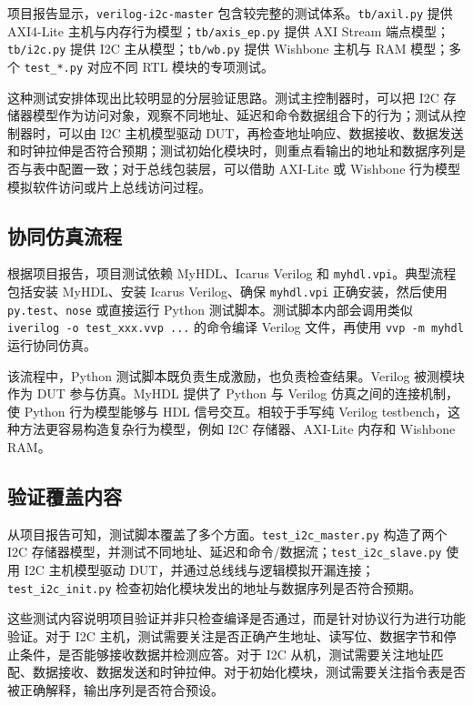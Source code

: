 \documentclass[12pt,a4paper]{article}
\numberwithin{equation}{section}
\begin{document}
项目报告显示，\texttt{verilog-i2c-master} 包含较完整的测试体系。\texttt{tb/axil.py} 提供 AXI4-Lite 主机与内存行为模型；\texttt{tb/axis\_ep.py} 提供 AXI Stream 端点模型；\texttt{tb/i2c.py} 提供 I2C 主从模型；\texttt{tb/wb.py} 提供 Wishbone 主机与 RAM 模型；多个 \texttt{test\_*.py} 对应不同 RTL 模块的专项测试。

这种测试安排体现出比较明显的分层验证思路。测试主控制器时，可以把 I2C 存储器模型作为访问对象，观察不同地址、延迟和命令数据组合下的行为；测试从控制器时，可以由 I2C 主机模型驱动 DUT，再检查地址响应、数据接收、数据发送和时钟拉伸是否符合预期；测试初始化模块时，则重点看输出的地址和数据序列是否与表中配置一致；对于总线包装层，可以借助 AXI-Lite 或 Wishbone 行为模型模拟软件访问或片上总线访问过程。

\subsection{协同仿真流程}

根据项目报告，项目测试依赖 MyHDL、Icarus Verilog 和 \texttt{myhdl.vpi}。典型流程包括安装 MyHDL、安装 Icarus Verilog、确保 \texttt{myhdl.vpi} 正确安装，然后使用 \texttt{py.test}、\texttt{nose} 或直接运行 Python 测试脚本。测试脚本内部会调用类似 \texttt{iverilog -o test\_xxx.vvp ...} 的命令编译 Verilog 文件，再使用 \texttt{vvp -m myhdl} 运行协同仿真。

该流程中，Python 测试脚本既负责生成激励，也负责检查结果。Verilog 被测模块作为 DUT 参与仿真。MyHDL 提供了 Python 与 Verilog 仿真之间的连接机制，使 Python 行为模型能够与 HDL 信号交互。相较于手写纯 Verilog testbench，这种方法更容易构造复杂行为模型，例如 I2C 存储器、AXI-Lite 内存和 Wishbone RAM。

\subsection{验证覆盖内容}

从项目报告可知，测试脚本覆盖了多个方面。\texttt{test\_i2c\_master.py} 构造了两个 I2C 存储器模型，并测试不同地址、延迟和命令/数据流；\texttt{test\_i2c\_slave.py} 使用 I2C 主机模型驱动 DUT，并通过总线线与逻辑模拟开漏连接；\texttt{test\_i2c\_init.py} 检查初始化模块发出的地址与数据序列是否符合预期。

这些测试内容说明项目验证并非只检查编译是否通过，而是针对协议行为进行功能验证。对于 I2C 主机，测试需要关注是否正确产生地址、读写位、数据字节和停止条件，是否能够接收数据并检测应答。对于 I2C 从机，测试需要关注地址匹配、数据接收、数据发送和时钟拉伸。对于初始化模块，测试需要关注指令表是否被正确解释，输出序列是否符合预设。
\end{document}
